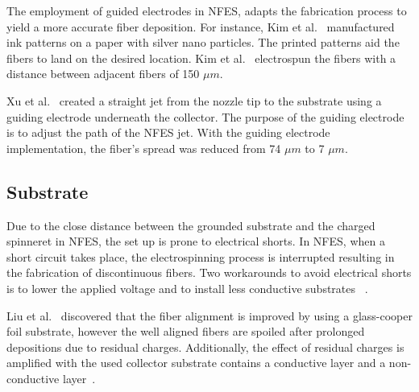 \documentclass[5p,,preprint,12pt,twocolumn]{elsarticle}
\begin{document}
The employment of guided electrodes in NFES, adapts the fabrication process to yield a more accurate fiber deposition. For instance, Kim et al.\unskip~\cite{527120:11974313} manufactured ink patterns on a paper with silver nano particles. The printed patterns aid the fibers to land on the desired location. Kim et al.\unskip~\cite{527120:11974313} electrospun the fibers with a distance between adjacent fibers of 150 $\mu m $.

Xu et al.\unskip~\cite{527120:11974325} created a straight jet from the nozzle tip to the substrate using a guiding electrode underneath the collector. The purpose of the guiding electrode is to adjust the path of the NFES jet. With the guiding electrode implementation, the fiber's spread was reduced from 74 $\mu m $ to 7 $\mu m $.



\subsection{Substrate}Due to the close distance between the grounded substrate and the charged spinneret in NFES, the set up is prone to electrical shorts. In NFES, when a short circuit takes place, the electrospinning process is interrupted resulting in the fabrication of discontinuous fibers. Two workarounds to avoid electrical shorts is to lower the applied voltage and to install less conductive substrates \unskip~\cite{527120:11974315,527120:12322289}.

Liu et al.\unskip~\cite{527120:11974315} discovered that the fiber alignment is improved by using a glass-cooper foil substrate, however the well aligned fibers are spoiled after prolonged depositions due to residual charges. Additionally, the effect of residual charges is amplified with the used collector substrate contains a conductive layer and a non-conductive layer\unskip~\cite{527120:11974315}.
\end{document}
